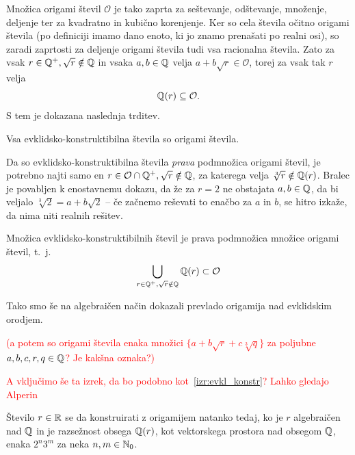 Množica origami števil $\mathcal{O}$ je tako zaprta za seštevanje, odštevanje, množenje, deljenje ter za kvadratno in kubično korenjenje. Ker so cela števila očitno origami števila (po definiciji imamo dano enoto, ki jo znamo prenašati po realni osi), so zaradi zaprtosti za deljenje origami števila tudi vsa racionalna števila. Zato za vsak $r \in \mathbb Q^+, \sqrt{r} \notin \mathbb Q$ in vsaka $a, b \in \mathbb Q$ velja $a + b\sqrt{r} \in \mathcal{O}$, torej za vsak tak $r$ velja
$$ \mathbb Q(r) \subseteq \mathcal{O}. $$
S tem je dokazana naslednja trditev.

\begin{trditev}
    Vsa evklidsko-konstruktibilna števila so origami števila.
\end{trditev}

Da so evklidsko-konstruktibilna števila \emph{prava} podmnožica origami števil, je potrebno najti samo en $r \in \mathcal{O} \cap \mathbb Q^+, \sqrt{r} \notin \mathbb Q$, za katerega velja $\sqrt[3]{r} \notin \mathbb Q(r)$. Bralec je povabljen k enostavnemu dokazu, da že za $r = 2$ ne obstajata $a, b \in \mathbb Q$, da bi veljalo $\sqrt[3]{2} = a + b\sqrt{2}$ -- če začnemo reševati to enačbo za $a$ in $b$, se hitro izkaže, da nima niti realnih rešitev.

\begin{izrek}
    Množica evklidsko-konstruktibilnih števil je prava podmnožica množice origami števil, t.\ j.
    $$ \bigcup_{r \in \mathbb Q^+, \sqrt{r} \notin \mathbb Q} \mathbb Q(r) \subset \mathcal{O} $$
\end{izrek}

Tako smo še na algebraičen način dokazali prevlado origamija nad evklidskim orodjem.

\textcolor{red}{(a potem so origami števila enaka množici $\{ a + b \sqrt{r} + c \sqrt[3]{q} \}$ za poljubne $a, b, c, r, q \in \mathbb Q$? Je kakšna oznaka?)}

\textcolor{red}{A vključimo še ta izrek, da bo podobno kot~\ref{izr:evkl_konstr}? Lahko gledajo Alperin~\cite{alperin2000}}

\begin{izrek}
    \label{izr:origami_konstr}
    Število $r \in \mathbb R$ se da konstruirati z origamijem natanko tedaj, ko je $r$ algebraičen nad $\mathbb Q$ in je razsežnost obsega $\mathbb Q(r)$, kot vektorskega prostora nad obsegom $\mathbb Q$, enaka $2^n 3^m$ za neka $n, m \in \mathbb N_0$.
\end{izrek}
